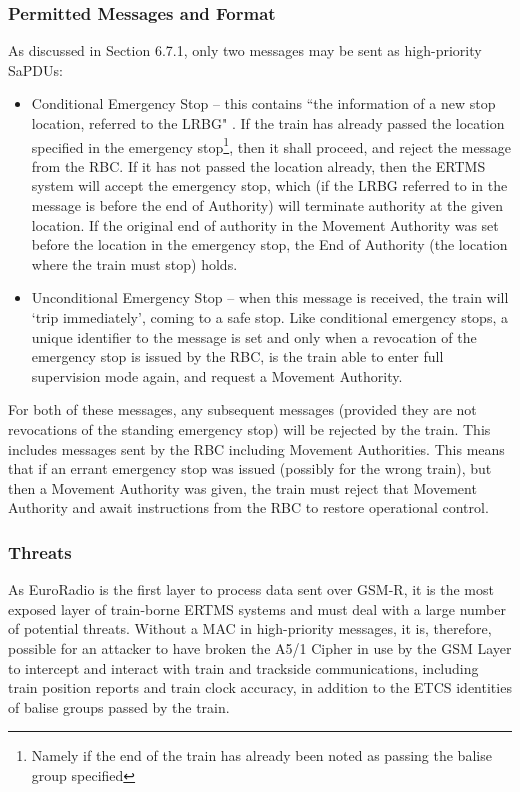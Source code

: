 \documentclass[twoside,11pt,a4paper]{article}
\begin{document}
\subsubsection{Permitted Messages and Format}
As discussed in Section 6.7.1, only two messages \citep[Section 8.5.3]{SUBSET-026-8} may be sent as high-priority SaPDUs:
\begin{itemize}[nolistsep]
\item Conditional Emergency Stop -- this contains ``the information of a new stop location, referred to the LRBG" \citep[Section 3.10.2]{SUBSET-026-3}. If the train has already passed the location specified in the emergency stop\footnote{Namely if the end of the train has already been noted as passing the balise group specified}, then it shall proceed, and reject the message from the RBC. If it has not passed the location already, then the ERTMS system will accept the emergency stop, which (if the LRBG referred to in the message is before the end of Authority) will terminate authority at the given location. If the original end of authority in the Movement Authority was set before the location in the emergency stop, the End of Authority (the location where the train must stop) holds.
\item Unconditional Emergency Stop -- when this message is received, the train will `trip immediately', coming to a safe stop. Like conditional emergency stops, a unique identifier to the message is set and only when a revocation of the emergency stop is issued by the RBC, is the train able to enter full supervision mode again, and request a Movement Authority.
\end{itemize}
For both of these messages, any subsequent messages (provided they are not revocations of the standing emergency stop) will be rejected by the train. This includes messages sent by the RBC including Movement Authorities. This means that if an errant emergency stop was issued (possibly for the wrong train), but then a Movement Authority was given, the train must reject that Movement Authority and await instructions from the RBC to restore operational control.

\subsubsection{Threats}
As EuroRadio is the first layer to process data sent over GSM-R, it is the most exposed layer of train-borne ERTMS systems and must deal with a large number of potential threats. Without a MAC in high-priority messages, it is, therefore, possible for an attacker to have broken the A5/1 Cipher in use by the GSM Layer to intercept and interact with train and trackside communications, including train position reports and train clock accuracy, in addition to the ETCS identities of balise groups passed by the train.
\end{document}

